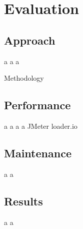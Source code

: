 \chapter{Evaluation}

\section{Approach} \newpage a \newpage a \newpage a

Methodology

\section{Performance} \newpage a \newpage a \newpage a \newpage a
JMeter
loader.io

\section{Maintenance} \newpage a \newpage a

\section{Results} \newpage a \newpage a